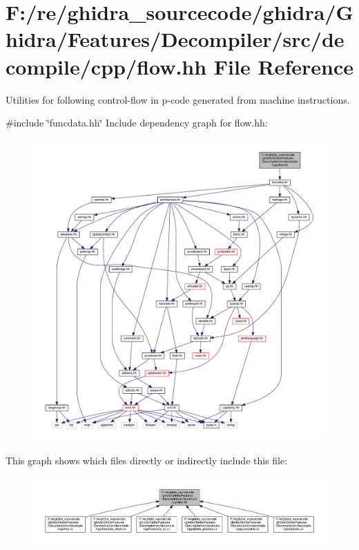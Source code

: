 \hypertarget{flow_8hh}{}\section{F\+:/re/ghidra\+\_\+sourcecode/ghidra/\+Ghidra/\+Features/\+Decompiler/src/decompile/cpp/flow.hh File Reference}
\label{flow_8hh}


Utilities for following control-\/flow in p-\/code generated from machine instructions.  


{\ttfamily \#include \char`\"{}funcdata.\+hh\char`\"{}}\newline
Include dependency graph for flow.\+hh\+:
\nopagebreak
\begin{figure}[H]
\begin{center}
\leavevmode
\includegraphics[width=350pt]{flow_8hh__incl}
\end{center}
\end{figure}
This graph shows which files directly or indirectly include this file\+:
\nopagebreak
\begin{figure}[H]
\begin{center}
\leavevmode
\includegraphics[width=350pt]{flow_8hh__dep__incl}
\end{center}
\end{figure}
